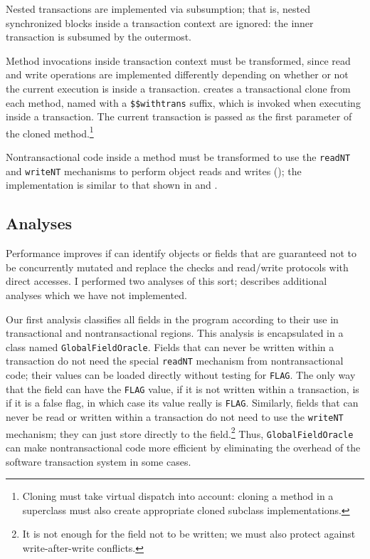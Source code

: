 Nested transactions are implemented via subsumption; that is, nested
synchronized blocks inside a transaction context are ignored: the
inner transaction is subsumed by the outermost.

\label{sec:withtrans}
Method invocations inside transaction context must be transformed,
since read and write operations are implemented differently depending
on whether or not the current execution is inside a transaction.  \Flex
creates a transactional clone from each method, named with a
\texttt{\$\$withtrans} suffix, which is invoked when executing
inside a transaction.  The current transaction is passed as the first
parameter of the cloned method.\footnote{Cloning must take virtual
  dispatch into account: cloning a method in a superclass must also
  create appropriate cloned subclass implementations.}

Nontransactional code inside a method must be transformed to use the
\texttt{readNT} and \texttt{writeNT} mechanisms to perform object
reads and writes (); the implementation is similar to
that shown in  and .

\subsection{Analyses}\label{sec:hoist} %
Performance improves if \flex can identify objects or fields
that are guaranteed not to be concurrently mutated and replace the
checks and read/write protocols with direct accesses.  I performed two
analyses of this sort;  describes additional analyses
which we have not implemented.

Our first analysis classifies all fields in the program according to
their use in transactional and nontransactional regions.  This
analysis is encapsulated in a \flex class named
\texttt{GlobalFieldOracle}.  Fields that can never be written within
a transaction do not need the special \texttt{readNT} mechanism from
nontransactional code; their values can be loaded directly without
testing for \texttt{FLAG}\@.  The only way that the field can have the
\texttt{FLAG} value, if it is not written within a transaction, is if
it is a false flag, in which case its value really is \texttt{FLAG}\@.
Similarly, fields that can never be read or written within a
transaction do not need to use the \texttt{writeNT} mechanism; they
can just store directly to the field.\footnote{It is not
  enough for the field not to be written; we must also protect against
  write-after-write conflicts.}  Thus, \texttt{GlobalFieldOracle} can
make nontransactional code more efficient by eliminating the overhead
of the software transaction system in some cases.

